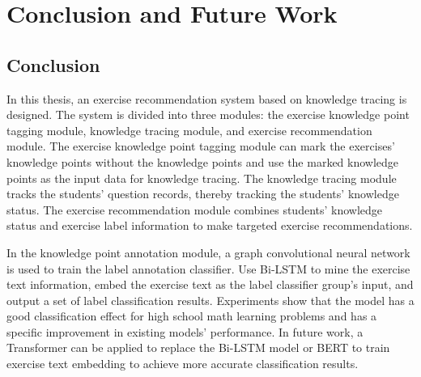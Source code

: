 \chapter{Conclusion and Future Work}
\section{Conclusion}
In this thesis, an exercise recommendation system based on knowledge tracing is designed. The system is divided into three modules: the exercise knowledge point tagging module, knowledge tracing module, and exercise recommendation module. The exercise knowledge point tagging module can mark the exercises' knowledge points without the knowledge points and use the marked knowledge points as the input data for knowledge tracing. The knowledge tracing module tracks the students' question records, thereby tracking the students' knowledge status. The exercise recommendation module combines students' knowledge status and exercise label information to make targeted exercise recommendations.


In the knowledge point annotation module, a graph convolutional neural network is used to train the label annotation classifier. Use Bi-LSTM to mine the exercise text information, embed the exercise text as the label classifier group's input, and output a set of label classification results. Experiments show that the model has a good classification effect for high school math learning problems and has a specific improvement in existing models' performance. In future work, a Transformer can be applied to replace the Bi-LSTM model or BERT to train exercise text embedding to achieve more accurate classification results.


